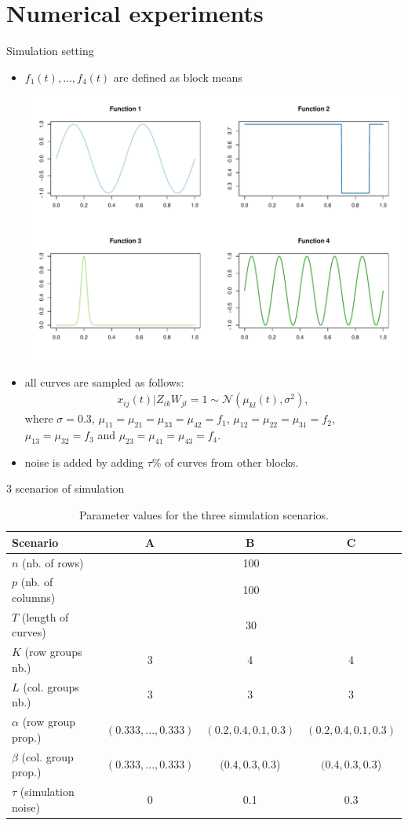 \documentclass[10pt]{beamer}
\begin{document}
\section{Numerical experiments}

\begin{frame}{Simulation setting}
\begin{itemize}
\item $f_{1}(t),...,f_{4}(t)$ are defined as block means\\
\begin{centering}
\includegraphics[width=0.5\columnwidth]{images/Fig-Simu-functions}
\par\end{centering}
\item all curves are sampled as follows:
\begin{eqnarray*}
x_{ij}(t)|Z_{ik}W_{jl}=1\sim\mathcal{N}(\mu_{kl}(t),\sigma^{2}),
\end{eqnarray*}
{\small where $\sigma=0.3$, $\mu_{11}=\mu_{21}=\mu_{33}=\mu_{42}=f_{1}$,
$\mu_{12}=\mu_{22}=\mu_{31}=f_{2}$, $\mu_{13}=\mu_{32}=f_{3}$ and
$\mu_{23}=\mu_{41}=\mu_{43}=f_{4}$.}
\item noise is added by adding $\tau\%$ of curves from other blocks.
\end{itemize}
\end{frame}


\begin{frame}{3 scenarios of simulation}
\begin{table}
\caption{\label{tab:Parameter-values}Parameter values for the three simulation
scenarios.}
\begin{small}
\begin{tabular}{|l|c|c|c|}
\hline 
Scenario & A & B & C\tabularnewline
\hline 
\hline 
$n$ (nb. of rows) & \multicolumn{3}{c|}{100}\tabularnewline
\hline 
$p$ (nb. of columns) & \multicolumn{3}{c|}{100}\tabularnewline
\hline 
$T$ (length of curves) & \multicolumn{3}{c|}{30}\tabularnewline
\hline 
$K$ (row groups nb.) & 3 & 4 & 4\tabularnewline
\hline 
$L$ (col. groups nb.) & 3 & 3 & 3\tabularnewline
\hline 
$\alpha$ (row group prop.) & $(0.333,...,0.333)$ & $(0.2,0.4,0.1,0.3)$ & $(0.2,0.4,0.1,0.3)$\tabularnewline
\hline 
$\beta$ (col. group prop.) & $(0.333,...,0.333)$ & $(0.4,0.3,0.3$) & $(0.4,0.3,0.3$)\tabularnewline
\hline 
$\tau$ (simulation noise) & 0 & 0.1 & 0.3\tabularnewline
\hline 
\end{tabular}
\end{small}
\end{table}
\end{frame}
\end{document}
